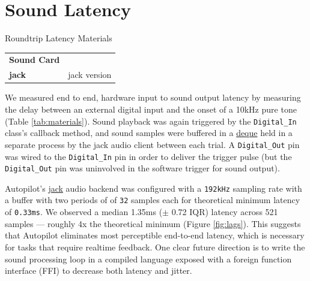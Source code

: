 \section{Sound Latency}
\label{sec:soundlatency}

\begin{margintable}[0cm]
\caption{Roundtrip Latency Materials}
\label{tab:gpiomaterials}
\noindent\begin{tabularx}{\linewidth}{lX}%
\toprule
\textbf{Sound Card} &  \\
\textbf{jack} & jack version \\
\bottomrule
\end{tabularx}
\end{margintable}

We measured end to end, hardware input to sound output latency by measuring the delay between an external digital input and the onset of a 10kHz pure tone (Table \ref{tab:materials}). Sound playback was again triggered by the \texttt{Digital\_In} class's callback method, and sound samples were buffered in a \href{https://docs.python.org/3/library/collections.html#collections.deque}{deque} held in a separate process by the jack audio client between each trial. A \texttt{Digital\_Out} pin was wired to the \texttt{Digital\_In} pin in order to deliver the trigger pulse (but the \texttt{Digital\_Out} pin was uninvolved in the software trigger for sound output).

Autopilot's \href{http://jackaudio.org/}{jack} audio backend was configured with a \texttt{192kHz} sampling rate with a buffer with two periods of of \texttt{32} samples each for theoretical minimum latency of \texttt{0.33ms}. We observed a median 1.35ms ($\pm$ 0.72 IQR) latency across 521 samples --- roughly 4x the theoretical minimum (Figure \ref{fig:lags}). This suggests that Autopilot eliminates most perceptible end-to-end latency, which is necessary for tasks that require realtime feedback. One clear future direction is to write the sound processing loop in a compiled language exposed with a foreign function interface (FFI) to decrease both latency and jitter.


